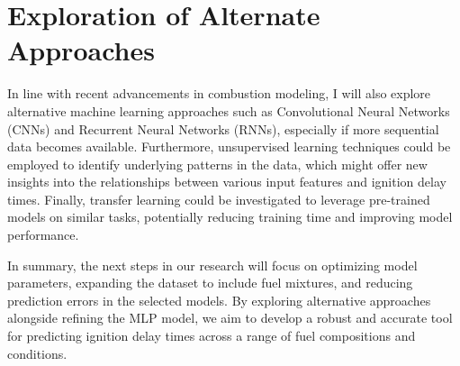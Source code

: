 \documentclass[12pt]{report}
\begin{document}
\section{Exploration of Alternate Approaches}

In line with recent advancements in combustion modeling, I will also explore alternative machine learning approaches such as Convolutional Neural Networks (CNNs) and Recurrent Neural Networks (RNNs), especially if more sequential data becomes available. Furthermore, unsupervised learning techniques could be employed to identify underlying patterns in the data, which might offer new insights into the relationships between various input features and ignition delay times. Finally, transfer learning could be investigated to leverage pre-trained models on similar tasks, potentially reducing training time and improving model performance.

In summary, the next steps in our research will focus on optimizing model parameters, expanding the dataset to include fuel mixtures, and reducing prediction errors in the selected models. By exploring alternative approaches alongside refining the MLP model, we aim to develop a robust and accurate tool for predicting ignition delay times across a range of fuel compositions and conditions.





\newpage
\end{document}
